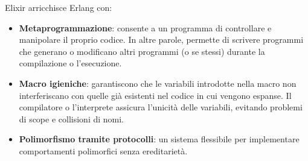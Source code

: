 \documentclass{article}
\begin{document}
Elixir arricchisce Erlang con:
\begin{itemize}
    \item \textbf{Metaprogrammazione}: consente a un programma di controllare e manipolare il proprio codice. In altre parole, permette di scrivere programmi che generano o modificano altri programmi (o se stessi) durante la compilazione o l'esecuzione.
    \item \textbf{Macro igieniche}: garantiscono che le variabili introdotte nella macro non interferiscano con quelle già esistenti nel codice in cui vengono espanse. Il compilatore o l'interprete assicura l'unicità delle variabili, evitando problemi di scope e collisioni di nomi.
    \item \textbf{Polimorfismo tramite protocolli}: un sistema flessibile per implementare comportamenti polimorfici senza ereditarietà.
\end{itemize}
\end{document}
